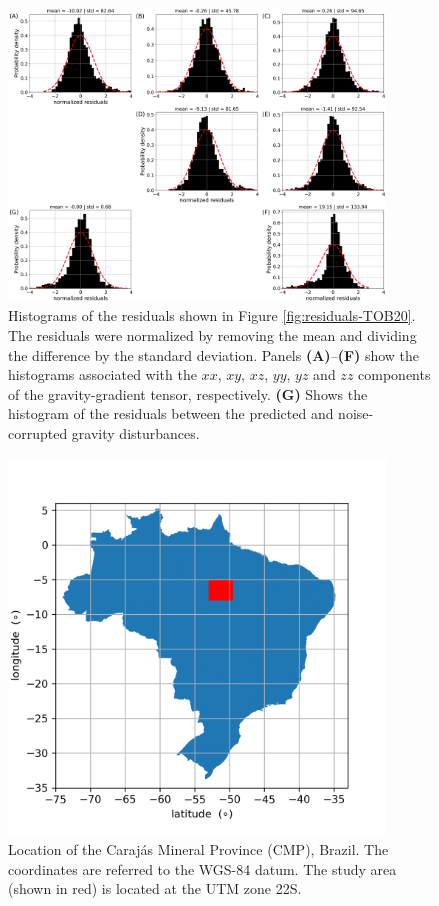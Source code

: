 \documentclass[utf8]{FrontiersinHarvard} %
\begin{document}
	\begin{figure}[htbp]
		\begin{center}
			\includegraphics[width=10cm]{Fig/TOB20_histograms}
		\end{center}
		\caption{
			Histograms of the residuals shown in Figure \ref{fig:residuals-TOB20}.
			The residuals were normalized by removing the mean and dividing the difference
			by the standard deviation.
			Panels \textbf{(A)}--\textbf{(F)} show the histograms associated with the 
			$xx$, $xy$, $xz$, $yy$, $yz$ and $zz$ components of the gravity-gradient tensor, respectively. 
			\textbf{(G)} Shows the histogram of the residuals between the predicted and noise-corrupted gravity disturbances.
		}
		\label{fig:histograms-TOB20}
	\end{figure}
	
	
	\begin{figure}[htbp]
		\begin{center}
			\includegraphics[width=10cm]{Fig/Brazil_map}
		\end{center}
		\caption{
			Location of the Caraj{\'a}s Mineral Province (CMP), Brazil. 
			The coordinates are referred to the WGS-84 datum. The study area (shown in red)
			is located at the UTM zone 22S.
		}
		\label{fig:carajas-location}
	\end{figure}
	
\end{document}
